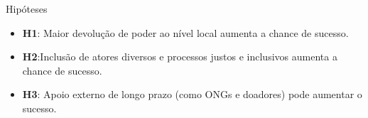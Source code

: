 \begin{frame}{Hipóteses}
\begin{itemize}
    \item \textbf{H1}: Maior devolução de poder ao nível local aumenta a chance de sucesso.
    \item \textbf{H2}:Inclusão de atores diversos e processos justos e inclusivos aumenta a chance de sucesso.
    \item \textbf{H3}: Apoio externo de longo prazo (como ONGs e doadores) pode aumentar o sucesso.
\end{itemize}
\end{frame}
